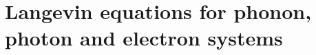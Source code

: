 

 


% 

\section{Langevin equations for phonon, photon and electron systems}
\label{sec:th_eom1}

